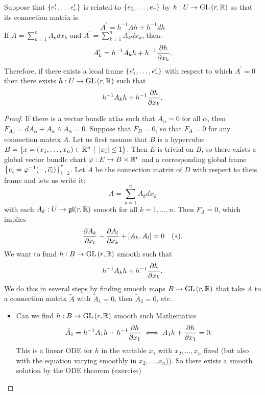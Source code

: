 \documentclass[main.tex]{subfiles}
\begin{document}
Suppose that $\left\{e_1^\prime, \dots e_r^\prime\right\}$ is related to $\left\{e_1,\dots, e_r\right\}$ by $h: U \to \text{GL}\left( r, \mathbb{R} \right)$ so that its connection matrix is
\[
A^\prime = h^{-1} A h + h^{-1} dh
\]
If $A = \sum_{k=1}^n A_k dx_k$ and $A^\prime = \sum_{k=1}^n A_k^\prime dx_k$, then:
\[
A^\prime_k = h^{-1}A_k h + h^{-1}\frac{ \partial h }{ \partial x_k }.
\]
Therefore, if there exists a lcoal frame $\left\{e_1^\prime, \dots, e_r^\prime\right\}$ with respect to which $A^\prime = 0$ then there exists $h: U \to \text{GL}\left( r, \mathbb{R} \right)$ such that
\[
h^{-1}A_k h + h^{-1}\frac{ \partial h }{ \partial x_k }.
\]

\begin{proof}
  \impliedpf If there is a vector bundle atlas such that $A_\alpha = 0$ for all $\alpha$, then $F_{A_\alpha} = d A_\alpha + A_\alpha \wedge A_\alpha = 0$. \impliespf Suppose that $F_D = 0$, so that $F_A = 0$ for any connection matrix $A$. Let us first assume that $B$ is a hypercube: $B = \left\{ x = (x_1,\dots, x_n) \in \mathbb{R}^n \ | \  \left| x_i \right| \leq 1 \right\}$. Then $E$ is trivial on $B$, so there exists a global vector bundle chart $ \varphi: E \to B \times \mathbb{R}^r$ and a corresponding global frame $\left\{ e_i = \varphi^{-1}(-, \vec{e}_i) \right\}_{i=1}^r$. Let $A$ be the connection matrix of $D$ with respect to theis frame and lets us write it:
  \[
    A = \sum_{k=1}^n A_k dx_k
  \]
  with each $A_k : U \to \mathfrak{gl}(r, \mathbb{R})$ smooth for all $k = 1,\dots, n$. Then $F_A = 0$, which implies
  \[
    \frac{ \partial A_k }{ \partial x_l } - \frac{ \partial A_l }{ \partial x_k } + [A_k, A_l] = 0 \hspace{1em} (*).
  \]
  We want to fund $h : B \to \text{GL}\left( r, \mathbb{R} \right)$ smooth such that
  \[
  h^{-1}A_k h + h^{-1} \frac{ \partial h }{ \partial x_k }.
  \]
  We do this in several steps by finding smooth maps $B \to \text{GL}\left( r, \mathbb{R} \right)$ that take $A$ to a connection matrix $\tilde{A}$ with $\tilde{A}_1 = 0$, then $\tilde{A}_2 = 0$, etc.

\begin{itemize}

  \item Can we find $h: B \to \text{GL}\left( r, \mathbb{R} \right)$ smooth such Mathematics
  \[
    \tilde{A}_1 = h^{-1}A_1 h + h^{-1}\frac{ \partial h }{ \partial x_1 } \iff A_1 h + \frac{ \partial h }{ \partial x_1 } = 0.
  \]
  This is a linear ODE for $h$ in the variable $x_1$ with $x_2, \dots, x_n$ fixed (but also with the equation varying smoothly in $x_2, \dots, x_n$)). So there exists a smooth solution by the ODE theorem (exercise)


\end{itemize}
\end{proof}
\end{document}
